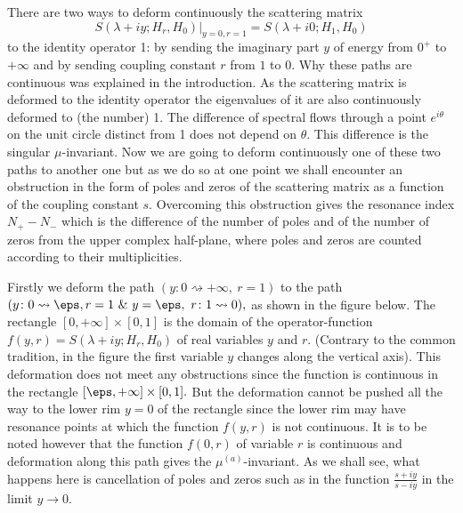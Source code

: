 \documentclass[11pt]{amsart}
\numberwithin{equation}{section}
\begin{document}
There are two ways to deform continuously the scattering matrix
$$
  S(\lambda+iy; H_r, H_0)\big|_{y=0, r=1} = S(\lambda+i0; H_1, H_0)
$$
to the identity operator 1: by sending the imaginary part $y$ of energy from $0^+$ to $+\infty$ and by sending coupling constant $r$
from $1$ to $0.$ Why these paths are continuous was explained in the introduction. As the scattering matrix is deformed to the identity operator
the eigenvalues of it are also continuously deformed to (the number) 1. The difference of spectral flows through a point $e^{i\theta}$ on the unit circle distinct from 1
does not depend on $\theta.$ This difference is the singular $\mu$-invariant. Now we are going to deform continuously one of these two paths
to another one but as we do so at one point we shall encounter an obstruction in the form of poles and zeros of the scattering matrix
as a function of the coupling constant $s.$ Overcoming this obstruction gives the resonance index $N_+-N_-$ which is the difference of the number
of poles and of the number of zeros from the upper complex half-plane, where poles and zeros are counted according to their multiplicities.

Firstly we deform the path $(y \colon 0 \rightsquigarrow + \infty, \ r = 1)$ to the path $(y \colon 0 \rightsquigarrow \eps, r = 1 \ \& \ y = \eps, \ r \colon 1 \rightsquigarrow 0),$
as shown in the figure below. The rectangle $[0,+\infty] \times [0,1]$ is the domain of the operator-function $f(y,r) = S(\lambda+iy; H_r, H_0)$ of real variables $y$ and $r.$
(Contrary to the common tradition, in the figure the first variable $y$ changes along the vertical axis).
This deformation does not meet any obstructions since the function is continuous in the rectangle $[\eps,+\infty] \times [0,1].$
But the deformation cannot be pushed all the way to the lower rim $y=0$ of the rectangle since the lower rim may have resonance points at which the function
$f(y,r)$ is not continuous.
It is to be noted however that the function $f(0,r)$ of variable $r$ is continuous and deformation along this path gives the ${\mu^{(a)}}$-invariant.
As we shall see, what happens here is cancellation of poles and zeros such as in the function $\frac{s+iy}{s-iy}$ in the limit $y \to 0.$
\end{document}
